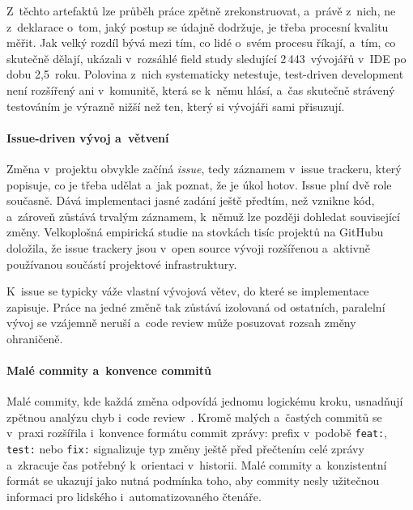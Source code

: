 Z~těchto artefaktů lze průběh práce zpětně zrekonstruovat, a~právě
z~nich, ne z~deklarace o~tom, jaký postup se údajně dodržuje, je
třeba procesní kvalitu měřit. Jak velký rozdíl bývá mezi tím, co
lidé o~svém procesu říkají, a~tím, co skutečně dělají, ukázali
\textcite{beller2019testing} v~rozsáhlé field study sledující
2\,443~vývojářů v~IDE po dobu 2,5~roku. Polovina z~nich systematicky
netestuje, test-driven development není rozšířený ani v~komunitě,
která se k~němu hlásí, a~čas skutečně strávený testováním je výrazně
nižší než ten, který si vývojáři sami přisuzují.

\paragraph{Issue-driven vývoj a~větvení}
Změna v~projektu obvykle začíná \textit{issue}, tedy záznamem
v~issue trackeru, který popisuje, co je třeba udělat a~jak poznat,
že je úkol hotov. Issue plní dvě role současně. Dává implementaci
jasné zadání ještě předtím, než vznikne kód, a~zároveň zůstává
trvalým záznamem, k~němuž lze později dohledat související změny.
Velkoplošná empirická studie \textcite{bissyande2013}
na stovkách tisíc projektů na GitHubu doložila, že issue trackery
jsou v~open source vývoji rozšířenou a~aktivně používanou součástí
projektové infrastruktury.

K~issue se typicky váže vlastní vývojová větev, do které se
implementace zapisuje. Práce na jedné změně tak zůstává izolovaná
od ostatních, paralelní vývoj se vzájemně neruší a~code review
může posuzovat rozsah změny ohraničeně.

\paragraph{Malé commity a~konvence commitů}
Malé commity, kde každá změna odpovídá jednomu logickému
kroku, usnadňují zpětnou analýzu chyb i~code
review~\cite{humble2010}. Kromě malých a~častých commitů se v~praxi rozšířila
i~konvence formátu commit zprávy: prefix v~podobě \texttt{feat:},
\texttt{test:} nebo \texttt{fix:} signalizuje typ změny ještě před
přečtením celé zprávy a~zkracuje čas potřebný k~orientaci v~historii.
Malé commity a~konzistentní formát se ukazují jako nutná podmínka toho,
aby commity nesly užitečnou informaci pro lidského i~automatizovaného
čtenáře.

